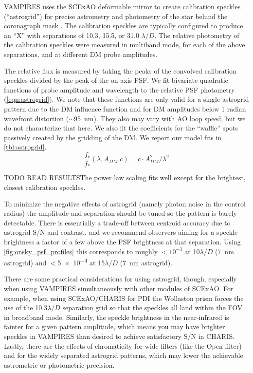 VAMPIRES uses the SCExAO deformable mirror to create calibration speckles (``astrogrid'') for precise astrometry and photometry of the star behind the coronagraph mask \citep{sahoo_precision_2020}. The calibration speckles are typically configured to produce an ``X'' with separations of 10.3, 15.5, or 31.0 $\lambda/D$. The relative photometry of the calibration speckles were measured in multiband mode, for each of the above separations, and at different DM probe amplitudes. 

The relative flux is measured by taking the peaks of the convolved calibration speckles divided by the peak of the on-axis PSF. We fit bivariate quadratic functions of probe amplitude and wavelength to the relative PSF photometry (\autoref{eqn:astrogrid}). We note that these functions are only valid for a single astrogrid pattern due to the DM influence function and for DM amplitudes below 1 radian wavefront distortion ($\sim$\SI{95}{\nano\meter}). They also may vary with AO loop speed, but we do not characterize that here. We also fit the coefficients for the ``waffle'' spots passively created by the gridding of the DM. We report our model fits in \autoref{tbl:astrogrid}.
\begin{equation}
    \label{eqn:astrogrid}
    \frac{f_c}{f_*}\left( \lambda, A_{DM} | c \right) = c \cdot A_{DM}^2 / \lambda^2
\end{equation}


TODO READ RESULTSThe power law scaling fits well except for the brightest, closest calibration speckles.

To minimize the negative effects of astrogrid (namely photon noise in the control radius) the amplitude and separation should be tuned so the pattern is barely detectable. There is essentially a trade-off between centroid accuracy due to astrogrid S/N and contrast, and we recommend observers aiming for a speckle brightness a factor of a few above the PSF brightness at that separation. Using \autoref{fig:onsky_psf_profiles} this corresponds to roughly $<10^{-3}$ at 10$\lambda/D$ (\SI{7}{\nano\meter} astrogrid) and $<$\num{5e-4} at 15$\lambda/D$ (\SI{7}{\nano\meter} astrogrid).

There are some practical considerations for using astrogrid, though, especially when using VAMPIRES simultaneously with other modules of SCExAO. For example, when using SCExAO/CHARIS for PDI the Wollaston prism forces the use of the 10.3$\lambda/D$ separation grid so that the speckles all land within the FOV in broadband mode. Similarly, the speckle brightness in the near-infrared is fainter for a given pattern amplitude, which means you may have brighter speckles in VAMPIRES than desired to achieve satisfactory S/N in CHARIS. Lastly, there are the effects of chromaticity for wide filters (like the Open filter) and for the widely separated astrogrid patterns, which may lower the achievable astrometric or photometric precision.

